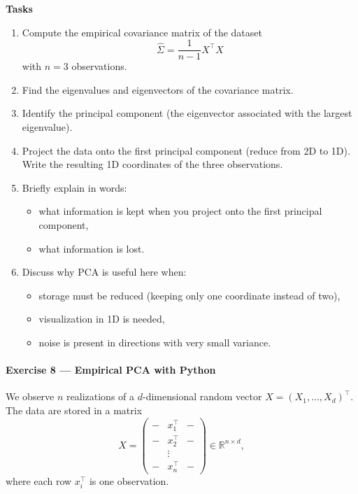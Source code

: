 \documentclass[11pt]{article}
\begin{document}
\noindent
\textbf{Tasks}
\begin{enumerate}
    \item Compute the empirical covariance matrix of the dataset
    \[
        \widehat\Sigma = \frac{1}{n-1} X^\top X
    \]
    with $n=3$ observations.

    \item Find the eigenvalues and eigenvectors of the covariance matrix.

    \item Identify the principal component (the eigenvector associated with the largest eigenvalue).

    \item Project the data onto the first principal component (reduce from 2D to 1D).  
    Write the resulting 1D coordinates of the three observations.

    \item Briefly explain in words:
    \begin{itemize}
        \item what information is kept when you project onto the first principal component,
        \item what information is lost.
    \end{itemize}

    \item Discuss why PCA is useful here when:
    \begin{itemize}
        \item storage must be reduced (keeping only one coordinate instead of two),
        \item visualization in 1D is needed,
        \item noise is present in directions with very small variance.
    \end{itemize}
\end{enumerate}

\paragraph{Exercise 8 — Empirical PCA with Python}

We observe $n$ realizations of a $d$-dimensional random vector 
$X = (X_1,\dots,X_d)^\top$. The data are stored in a matrix
\[
X = 
\begin{pmatrix}
- & x_1^\top & - \\
- & x_2^\top & - \\
  & \vdots   &   \\
- & x_n^\top & - 
\end{pmatrix}
\in \mathbb{R}^{n \times d},
\]
where each row $x_i^\top$ is one observation.
\end{document}

